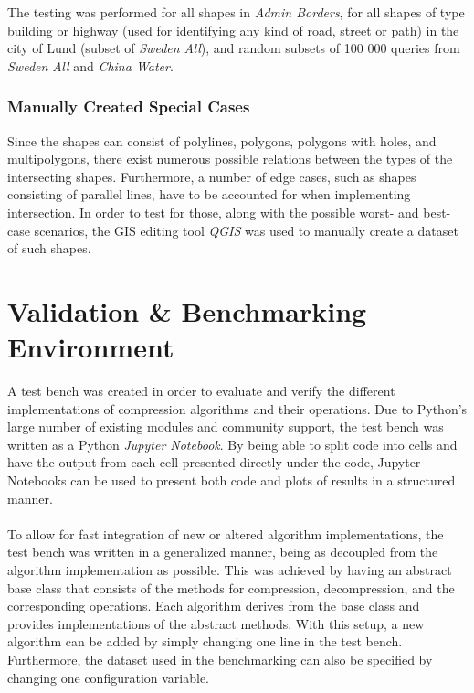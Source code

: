 The testing was performed for all shapes in \emph{Admin Borders}, for all shapes of type building or highway (used for identifying any kind of road, street or path) in the city of Lund (subset of \emph{Sweden All}), and random subsets of 100 000 queries from \emph{Sweden All} and \emph{China Water}.

\subsubsection{Manually Created Special Cases}
Since the shapes can consist of polylines, polygons, polygons with holes, and multipolygons, there exist numerous possible relations between the types of the intersecting shapes. Furthermore, a number of edge cases, such as shapes consisting of parallel lines, have to be accounted for when implementing intersection. In order to test for those, along with the possible worst- and best-case scenarios, the GIS editing tool \emph{QGIS} was used to manually create a dataset of such shapes.

\section{Validation \& Benchmarking Environment}
A test bench was created in order to evaluate and verify the different implementations of compression algorithms and their operations. Due to Python's large number of existing modules and community support, the test bench was written as a Python \emph{Jupyter Notebook}. By being able to split code into cells and have the output from each cell presented directly under the code, Jupyter Notebooks can be used to present both code and plots of results in a structured manner.
\\\\
To allow for fast integration of new or altered algorithm implementations, the test bench was written in a generalized manner, being as decoupled from the algorithm implementation as possible. This was achieved by having an abstract base class that consists of the methods for compression, decompression, and the corresponding operations. Each algorithm derives from the base class and provides implementations of the abstract methods. With this setup, a new algorithm can be added by simply changing one line in the test bench. Furthermore, the dataset used in the benchmarking can also be specified by changing one configuration variable.

